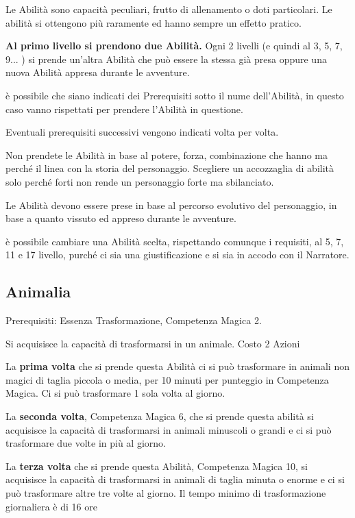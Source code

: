 \documentclass[a4paper,11pt,twoside,openany]{book}
\begin{document}
Le Abilità sono capacità peculiari, frutto di allenamento o doti particolari. Le abilità si ottengono più raramente ed hanno sempre un effetto pratico.

\textbf{Al primo livello si prendono due Abilità.} Ogni 2 livelli (e quindi al 3, 5, 7, 9... ) si prende un'altra Abilità che può essere la stessa già presa oppure una nuova Abilità appresa durante le avventure.

è possibile che siano indicati dei Prerequisiti sotto il nume dell'Abilità, in questo caso vanno rispettati per prendere l'Abilità in questione.

Eventuali prerequisiti successivi vengono indicati volta per volta.

Non prendete le Abilità in base al potere, forza, combinazione che hanno ma perché il linea con la storia del personaggio.
Scegliere un accozzaglia di abilità solo perché forti non rende un personaggio forte ma sbilanciato. 

\medskip
Le Abilità devono essere prese in base al percorso evolutivo del personaggio, in base a quanto vissuto ed appreso durante le avventure.
\medskip

è possibile cambiare una Abilità scelta, rispettando comunque i requisiti, al 5, 7, 11 e 17 livello, purché ci sia una giustificazione e si sia in accodo con il Narratore.

\subsection{Animalia}

Prerequisiti: Essenza Trasformazione, Competenza Magica 2.

Si acquisisce la capacità di trasformarsi in un animale. Costo 2 Azioni

La \textbf{prima volta} che si prende questa Abilità ci si può trasformare in animali non magici di taglia piccola o media, per 10 minuti per punteggio in Competenza Magica. Ci si può trasformare 1 sola volta al giorno.

La \textbf{seconda volta}, Competenza Magica 6, che si prende questa abilità si acquisisce la capacità di trasformarsi in animali minuscoli o grandi e ci si può trasformare due volte in più al giorno. 

La \textbf{terza volta} che si prende questa Abilità, Competenza Magica 10, si acquisisce la capacità di trasformarsi in animali di taglia minuta o enorme e ci si può trasformare altre tre volte al giorno. Il tempo minimo di trasformazione giornaliera è di 16 ore
\end{document}
